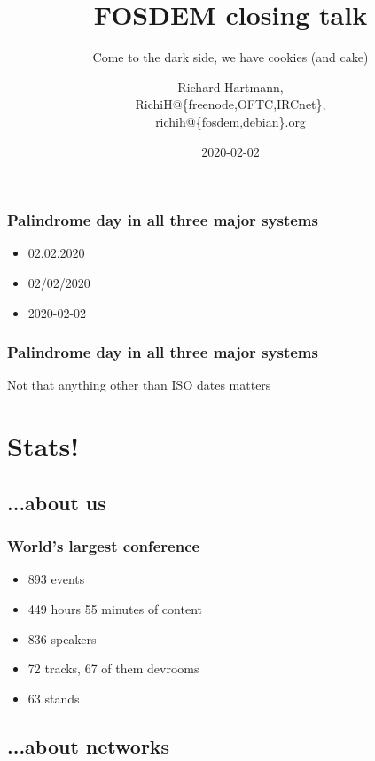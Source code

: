\documentclass[aspectratio=169]{beamer}
\title{FOSDEM closing talk}
\subtitle{Come to the dark side, we have cookies (and cake)}
\author{Richard Hartmann,\\
RichiH@\{freenode,OFTC,IRCnet\},\\
richih@\{fosdem,debian\}.org}
\date{2020-02-02}
\begin{document}
\setcounter{tocdepth}{1}

\begin{frame}
	\titlepage
\end{frame}




\begin{frame}
	\frametitle{Palindrome day in all three major systems}
	\vfill
	\begin{itemize}
		\item 02.02.2020
		\item 02/02/2020
		\item 2020-02-02
	\end{itemize}
	\vfill
\end{frame}

\begin{frame}
	\frametitle{Palindrome day in all three major systems}
	\begin{center}
	\vfill
		Not that anything other than ISO dates matters
	\vfill
	\end{center}
\end{frame}

\section{Stats!}

\subsection{...about us}

\begin{frame}
	\frametitle{World's largest conference}
	\vfill
	\begin{itemize}
		\item 893 events
		\item 449 hours 55 minutes of content
		\item 836 speakers
		\item 72 tracks, 67 of them devrooms
		\item 63 stands
	\end{itemize}
	\vfill
\end{frame}

\subsection{...about networks}
\end{document}
